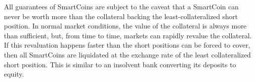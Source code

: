 All guarantees of SmartCoins are subject to the caveat that a SmartCoin can
never be worth more than the collateral backing the least-collateralized short
position. In normal market conditions, the value of the collateral is always
more than sufficient, but, from time to time, markets can rapidly revalue the
collateral. If this revaluation happens faster than the short positions can be
forced to cover, then all SmartCoins are liquidated at the exchange rate of the
least collateralized short position. This is similar to an insolvent bank
converting its deposits to equity.
